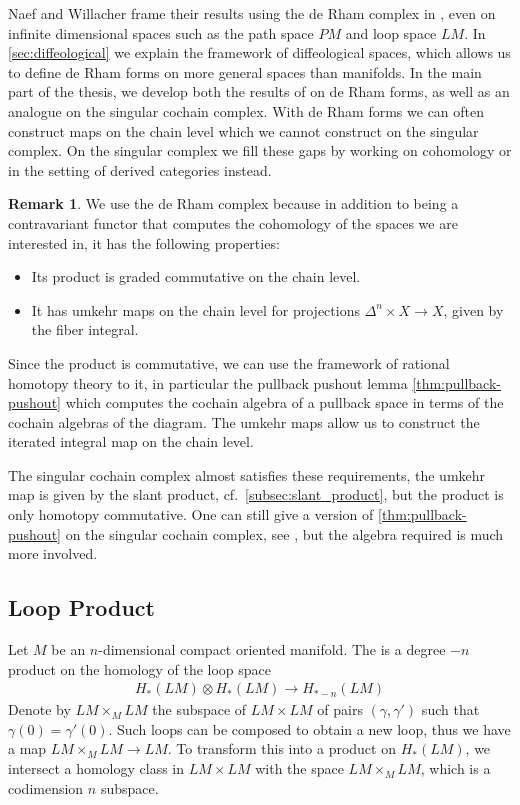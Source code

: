 \documentclass{scrartcl}
\let\emph\relax
\newcommand{\emphi}[1]{\index{#1}\emph{#1}}
\theoremstyle{plain}
\theoremstyle{definition}
\newtheorem{remark}[theorem]{Remark}
\begin{document}
Naef and Willacher frame their results using the de Rham complex in \cite{naef2019string}, even on infinite dimensional spaces such as the path space $PM$ and loop space $LM$. In \cref{sec:diffeological} we explain the framework of diffeological spaces, which allows us to define de Rham forms on more general spaces than manifolds. In the main part of the thesis, we develop both the results of \cite{naef2019string} on de Rham forms, as well as an analogue on the singular cochain complex. With de Rham forms we can often construct maps on the chain level which we cannot construct on the singular complex. On the singular complex we fill these gaps by working on cohomology or in the setting of derived categories instead. 

\begin{remark}
    We use the de Rham complex because in addition to being a contravariant functor that computes the cohomology of the spaces we are interested in, it has the following properties: 
    \begin{itemize}
        \item Its product is graded commutative on the chain level.
        \item It has umkehr maps on the chain level for projections $\Delta^n \times X\to X$, given by the fiber integral. 
    \end{itemize}
    Since the product is commutative, we can use the framework of rational homotopy theory to it, in particular the pullback pushout lemma \cref{thm:pullback-pushout} which computes the cochain algebra of a pullback space in terms of the cochain algebras of the diagram. The umkehr maps allow us to construct the iterated integral map on the chain level.

    The singular cochain complex almost satisfies these requirements, the umkehr map is given by the slant product, cf.\ \cref{subsec:slant_product}, but the product is only homotopy commutative. One can still give a version of \cref{thm:pullback-pushout} on the singular cochain complex, see \cite{toen2020probl}, 
    but the algebra required is much more involved. 
\end{remark}


\subsection{Loop Product}\label{subsec:loop-product-classical}
Let $M$ be an $n$-dimensional compact oriented manifold. The \emphi{loop product} is a degree $-n$ product on the homology of the loop space 
\begin{align*}
    H_*(LM)\otimes H_*(LM)\to H_{*-n}(LM)
\end{align*}
Denote by $LM\times_M LM$ the subspace of $LM\times LM$ of pairs $(\gamma, \gamma')$ such that $\gamma(0) = \gamma'(0)$. Such loops can be composed to obtain a new loop, thus we have a map $LM\times_M LM\to LM$. To transform this into a product on $H_*(LM)$, we intersect a homology class in $LM\times LM$ with the space $LM\times_M LM$, which is a codimension $n$ subspace.
\end{document}
